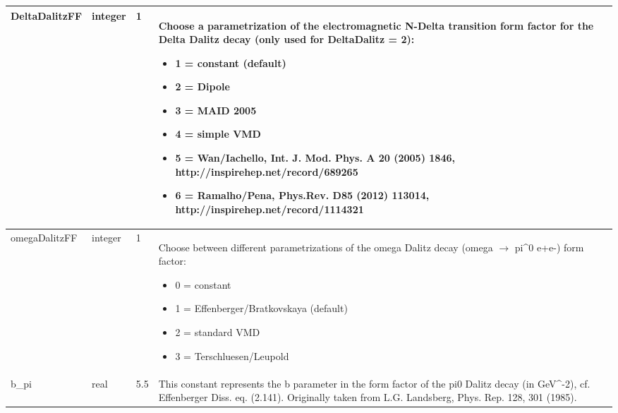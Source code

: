 \documentclass{article}
\begin{document}
\begin{longtable}{llll}
DeltaDalitzFF & \begin{minipage}[t]{2cm}integer\end{minipage} & \begin{minipage}[t]{2cm}1\end{minipage} & \begin{minipage}[t]{12cm}Choose a parametrization of the electromagnetic N-Delta transition form factor for the Delta Dalitz decay (only used for DeltaDalitz = 2):\begin{itemize}\leftmargin0em\itemindent0pt\item 1 = constant (default)\item 2 = Dipole\item 3 = MAID 2005\item 4 = simple VMD\item 5 = Wan/Iachello, Int. J. Mod. Phys. A 20 (2005) 1846,   http://inspirehep.net/record/689265\item 6 = Ramalho/Pena, Phys.Rev. D85 (2012) 113014,   http://inspirehep.net/record/1114321\end{itemize}\end{minipage}\\*
\midrule
omegaDalitzFF & \begin{minipage}[t]{2cm}integer\end{minipage} & \begin{minipage}[t]{2cm}1\end{minipage} & \begin{minipage}[t]{12cm}Choose between different parametrizations of the omega Dalitz decay (omega $\rightarrow$ pi\^{}0 e+e-) form factor:\begin{itemize}\leftmargin0em\itemindent0pt\item 0 = constant\item 1 = Effenberger/Bratkovskaya (default)\item 2 = standard VMD\item 3 = Terschluesen/Leupold\end{itemize}\end{minipage}\\*
\midrule
b\_pi & \begin{minipage}[t]{2cm}real\end{minipage} & \begin{minipage}[t]{2cm}5.5\end{minipage} & \begin{minipage}[t]{12cm}This constant represents the b parameter in the form factor of the pi0 Dalitz decay (in GeV\^{}-2), cf. Effenberger Diss. eq. (2.141). Originally taken from L.G. Landsberg, Phys. Rep. 128, 301 (1985).\end{minipage}\\*

\end{longtable}
\end{document}
